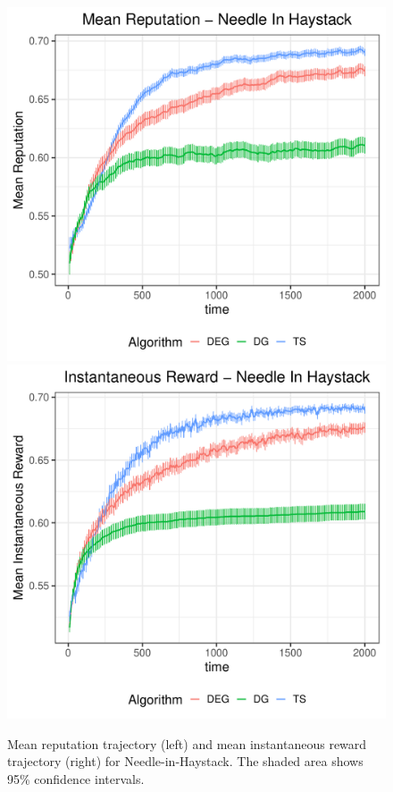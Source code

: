 \documentclass[../competing_bandits.tex]{subfiles}
\begin{document}
\begin{figure}
\centering
\includegraphics[scale=0.35]{ec19paper/figures/nih_mean}
\includegraphics[scale=0.35]{ec19paper/figures/mean_inst_reward_nih}
\caption{Mean reputation trajectory (left) and mean instantaneous reward trajectory (right) for Needle-in-Haystack. The shaded area shows 95\% confidence intervals.}
\label{prelim_means}
\end{figure}
\end{document}
